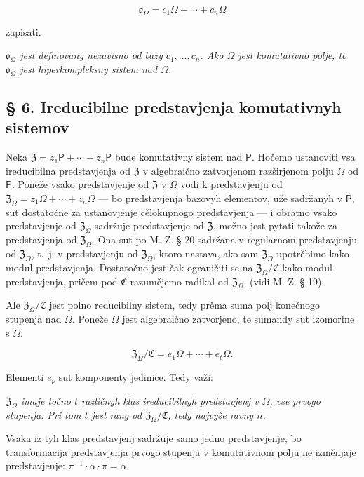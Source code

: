 \documentclass[11pt]{article}
\begin{document}
\[
\mathfrak{o}_{\Omega}=c_1\Omega+\cdots+c_n\Omega
\]

zapisati.

\emph{\(\mathfrak{o}_{\Omega}\) jest definovany nezavisno od bazy \(c_1,\ldots,c_n\). Ako \(\Omega\) jest komutativno polje, to \(\mathfrak{o}_{\Omega}\) jest hiperkompleksny sistem nad \(\Omega\).}

\subsection*{§ 6. Ireducibilne predstavjenja komutativnyh sistemov}\label{die-irreduziblen-darstellungen-kommutativer-systeme}

Neka \(\mathfrak Z=z_1\mathsf P+\cdots+z_n\mathsf P\) bude komutativny sistem nad \(\mathsf P\). Hočemo ustanoviti vsa ireducibilna predstavjenja od \(\mathfrak Z\) v algebraično zatvorjenom razširjenom polju \(\Omega\) od \(\mathsf P\). Poneže vsako predstavjenje od \(\mathfrak Z\) v \(\Omega\) vodi k predstavjenju od \(\mathfrak Z_\Omega=z_1\Omega+\cdots+z_n\Omega\) --- bo predstavjenja bazovyh elementov, uže sadržanyh v \(\mathsf P\), sut dostatočne za ustanovjenje cělokupnogo predstavjenja --- i obratno vsako predstavjenje od \(\mathfrak Z_\Omega\) sadržuje predstavjenje od \(\mathfrak Z\), možno jest pytati takože za predstavjenja od \(\mathfrak Z_\Omega\). Ona sut po M. Z. § 20 sadržana v regularnom predstavjenju od \(\mathfrak Z_\Omega\), t.~j. v predstavjenju od \(\mathfrak Z_\Omega\), ktoro nastava, ako sam \(\mathfrak Z_\Omega\) upotrěbimo kako modul predstavjenja. Dostatočno jest čak ograničiti se na \(\mathfrak Z_\Omega/\mathfrak C\) kako modul predstavjenja, pričem pod \(\mathfrak C\) razumějemo radikal od \(\mathfrak Z_\Omega\). (vidi M. Z. § 19).

Ale \(\mathfrak Z_\Omega/\mathfrak C\) jest polno reducibilny sistem, tedy prěma suma polj konečnogo stupenja nad \(\Omega\). Poneže \(\Omega\) jest algebraično zatvorjeno, te sumandy sut izomorfne s \(\Omega\).

\[
\mathfrak Z_\Omega/\mathfrak C=e_1\Omega+\cdots+e_t\Omega.
\]

Elementi \(e_\nu\) sut komponenty jedinice. Tedy važi:

\emph{\(\mathfrak Z_\Omega\) imaje točno \(t\) različnyh klas ireducibilnyh predstavjenj v \(\Omega\), vse prvogo stupenja. Pri tom \(t\) jest rang od \(\mathfrak Z_\Omega/\mathfrak C\), tedy najvyše ravny \(n\).}

Vsaka iz tyh klas predstavjenj sadržuje samo jedno predstavjenje, bo transformacija predstavjenja prvogo stupenja v komutativnom polju ne izměnjaje predstavjenje: \(\pi^{-1}\cdot\alpha\cdot\pi=\alpha\).
\end{document}
